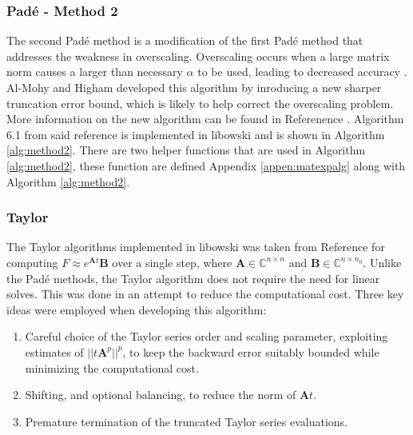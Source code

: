 \subsubsection{Pad\'e - Method 2}
The second Pad\'e method is a modification of the first Pad\'e method that addresses the weakness in overscaling. Overscaling occurs when a large matrix norm causes a larger than necessary $\alpha$ to be used, leading to decreased accuracy \cite{higham2009}. Al-Mohy and Higham developed this algorithm by inroducing a new sharper truncation error bound, which is likely to help correct the overscaling problem. More information on the new algorithm can be found in Referenence \cite{higham2009}. Algorithm 6.1 from said reference is implemented in libowski and is shown in Algorithm \ref{alg:method2}. There are two helper functions that are used in Algorithm \ref{alg:method2}, these function are defined Appendix \ref{appen:matexpalg} along with Algorithm \ref{alg:method2}. 


\subsubsection{Taylor}
The Taylor algorithms implemented in libowski was taken from Reference \cite{higham2011} for computing $F \approx e^{\boldsymbol{A}t}\boldsymbol{B}$ over a single step, where $\boldsymbol{A} \in \mathbb{C}^{n\times n}$ and $\boldsymbol{B} \in \mathbb{C}^{n\times n_{0}}$. Unlike the Pad\'e methods, the Taylor algorithm does not require the need for linear solves. This was done in an attempt to reduce the computational cost. Three key ideas were employed when developing this algorithm:

\begin{enumerate}
    \item Careful choice of the Taylor series order and scaling parameter, exploiting estimates of $||t{\boldsymbol{A}}^{p}||^{p}$, to keep the backward error suitably bounded while minimizing the computational cost.
    \item Shifting, and optional balancing, to reduce the norm of $\boldsymbol{A}t$.
    \item Premature termination of the truncated Taylor series evaluations.
\end{enumerate}


